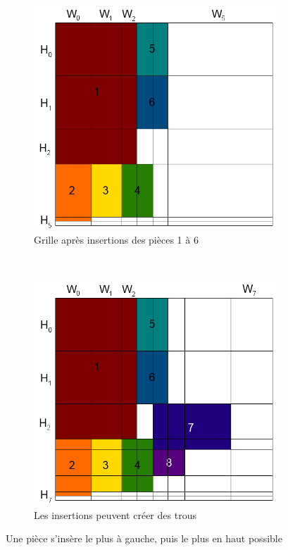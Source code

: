 \begin{figure}[!htb]
    \centering
    \begin{subfigure}{.48\linewidth}
        \centering
        \includegraphics[width=\linewidth]{img/ScanlineC4.png}
        \caption{Grille après insertions des pièces 1 à 6}
    \end{subfigure}%
    ~ 
    \begin{subfigure}{.48\linewidth}
        \centering
        \includegraphics[width=\linewidth]{img/ScanlineC5.png}
        \caption{Les insertions peuvent créer des trous}
    \end{subfigure}
    \caption{Une pièce s'insère le plus à gauche, puis le plus en haut possible}
    \label{fig:ScanlineC4-5}
\end{figure}


